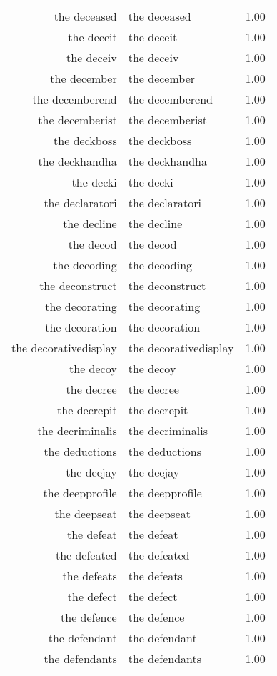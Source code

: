 \begin{table}[ht]
\begin{tabular}{rlr}
  the deceased & the deceased & 1.00 \\ 
  the deceit & the deceit & 1.00 \\ 
  the deceiv & the deceiv & 1.00 \\ 
  the december & the december & 1.00 \\ 
  the decemberend & the decemberend & 1.00 \\ 
  the decemberist & the decemberist & 1.00 \\ 
  the deckboss & the deckboss & 1.00 \\ 
  the deckhandha & the deckhandha & 1.00 \\ 
  the decki & the decki & 1.00 \\ 
  the declaratori & the declaratori & 1.00 \\ 
  the decline & the decline & 1.00 \\ 
  the decod & the decod & 1.00 \\ 
  the decoding & the decoding & 1.00 \\ 
  the deconstruct & the deconstruct & 1.00 \\ 
  the decorating & the decorating & 1.00 \\ 
  the decoration & the decoration & 1.00 \\ 
  the decorativedisplay & the decorativedisplay & 1.00 \\ 
  the decoy & the decoy & 1.00 \\ 
  the decree & the decree & 1.00 \\ 
  the decrepit & the decrepit & 1.00 \\ 
  the decriminalis & the decriminalis & 1.00 \\ 
  the deductions & the deductions & 1.00 \\ 
  the deejay & the deejay & 1.00 \\ 
  the deepprofile & the deepprofile & 1.00 \\ 
  the deepseat & the deepseat & 1.00 \\ 
  the defeat & the defeat & 1.00 \\ 
  the defeated & the defeated & 1.00 \\ 
  the defeats & the defeats & 1.00 \\ 
  the defect & the defect & 1.00 \\ 
  the defence & the defence & 1.00 \\ 
  the defendant & the defendant & 1.00 \\ 
  the defendants & the defendants & 1.00 \\ 

\end{tabular}
\end{table}
